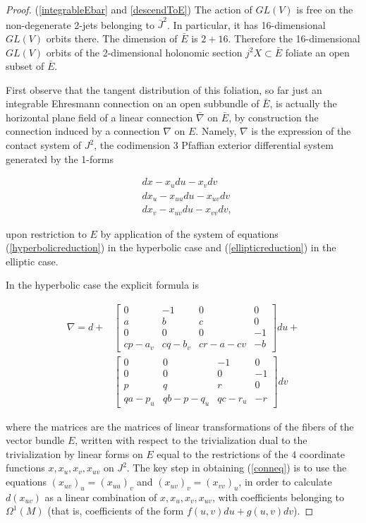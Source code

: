 \documentclass[11pt]{article}
\numberwithin{equation}{section}
\theoremstyle{plain}
\theoremstyle{remark}
\newcommand{\GL}{GL}
\begin{document}
\begin{proof} (\ref{integrableEbar} and \ref{descendToE}) The action of $\GL(V)$ is free on the non-degenerate 2-jets belonging to $\bar{J}^{2}$. %
In particular, it has 16-dimensional $\GL(V)$ orbits there. The dimension of $\bar{E}$ is $2+16$. Therefore the 16-dimensional $\GL(V)$ orbits of the 2-dimensional holonomic section $j^{2}X\subset \bar{E}$ foliate an open subset of $\bar{E}$. 

First observe that the tangent distribution of this foliation, so far just an integrable Ehresmann connection on an open subbundle of $\bar{E}$, is actually the horizontal plane field of a linear connection $\bar{\nabla}$ on $\bar{E}$, by construction the connection induced by a connection $\nabla$ on $E$. Namely, $\nabla$ is the expression of the contact system of $J^{2}$, the codimension 3 Pfaffian exterior differential system generated by the 1-forms

\begin{align*}
&dx - x_u du -x_v dv \\
&dx_u - x_{uu} du - x_{uv}dv\\
&dx_v - x_{uv} du - x_{vv}dv,
\end{align*}

upon restriction to $E$ by application of the system of equations (\ref{hyperbolicreduction}) in the hyperbolic case and (\ref{ellipticreduction}) in the elliptic case.

In the hyperbolic case the explicit formula is

\begin{equation}
\begin{split}
\label{conneq}\nabla = d +&
\begin{bmatrix} 0 & -1 & 0 & 0 \\ a & b & c & 0 \\ 0 & 0 & 0 & -1 \\cp-a_v & cq-b_v & cr-a-cv & -b\end{bmatrix} du + \\
&\begin{bmatrix} 0 & 0 & -1 & 0 \\ 0 & 0 & 0 & -1 \\ p & q & r & 0 \\ qa-p_u & qb-p-q_u & qc-r_u & -r  \end{bmatrix}dv
\end{split}
\end{equation}

where the matrices are the matrices of linear transformations of the fibers of the vector bundle $E$, written with respect to the trivialization dual to the trivialization by linear forms on $E$ equal to the restrictions of the $4$ coordinate functions $x,x_u,x_v,x_{uv}$ on $J^{2}$. The key step in obtaining (\ref{conneq}) is to use the equations $(x_{uv})_{u}=(x_{uu})_v$ and $(x_{uv})_{v}=(x_{vv})_u$, in order to calculate $d(x_{uv})$ as a linear combination of $x,x_u,x_v,x_{uv}$, with coefficients belonging to $\Omega^{1}(M)$ (that is, coefficients of the form $f(u,v)du+g(u,v)dv$).


\end{proof}
\end{document}
